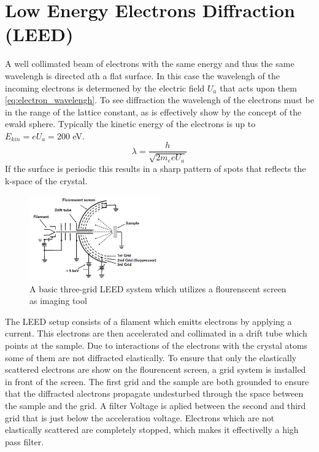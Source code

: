 \newpage

\section{Low Energy Electrons Diffraction (LEED)}
A well collimated beam of electrons with the same energy and thus the same wavelengh is directed ath a flat surface.
In this case the wavelengh of the incoming electrons is determened by the electric field $U_a$ that acts upon them \ref{eq:electron_wavelengh}.
To see diffraction the wavelengh of the electrons must be in the range of the lattice constant, as is effectively show by the concept of the ewald sphere.
Typically the kinetic energy of the electrons is up to $E_{kin} = e U_a = 200$ eV.
\begin{equation}
    \lambda = \frac{h}{\sqrt{2 m_e e U_a}}
    \label{eq:electron_wavelengh}
\end{equation} 
If the surface is periodic this results in a sharp pattern of spots that reflects the k-space of the crystal.

\begin{figure}
    \centering
    \includegraphics[width=0.5\textwidth]{graphics/fundamental_leed_setup.PNG}
    \caption{A basic three-grid LEED system which utilizes a flourenscent screen as imaging tool \cite{MoritzWolfgang2022SSDb}}
    \label{fig:LEED_Shematics}
\end{figure}

\noindent The LEED setup consists of a filament which emitts electrons by applying a current.
This electrons are then accelerated and collimated in a drift tube which points at the sample.
Due to interactions of the electrons with the crystal atoms some of them are not diffracted elastically.
To ensure that only the elastically scattered electrons are show on the flourencent screen, a grid system is installed in front of the screen.
The first grid and the sample are both grounded to ensure that the diffracted alectrons propagate undesturbed through the space between the sample and the grid.
A filter Voltage is aplied between the second and third grid that is just below the acceleration voltage.
Electrons which are not elastically scattered are completely stopped, which makes it effectivelly a high pass filter. \cite{MoritzWolfgang2022SSDb} \\

